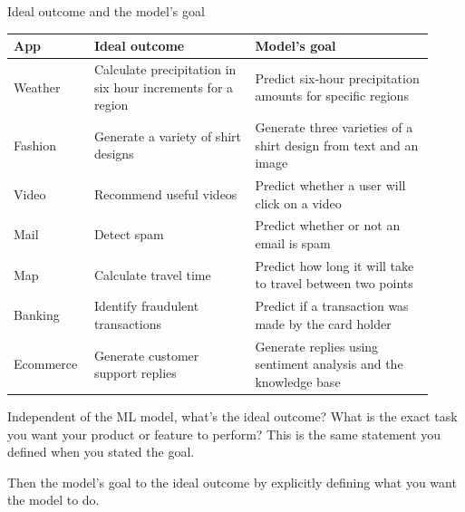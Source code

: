 \begin{frame}{Ideal outcome and the model's goal}
  \begin{withmargin}
    \begin{tdmain}
      \footnotesize
      \begin{tabular}{@{}p{0.16\linewidth}p{0.36\linewidth}p{0.40\linewidth}@{}}
        \toprule
        \textbf{App} & \textbf{Ideal outcome} & \textbf{Model's goal}\\
        \midrule
        Weather & Calculate precipitation in six hour increments for a region
          & Predict six-hour precipitation amounts for specific regions\\[0.3em]
        Fashion & Generate a variety of shirt designs
          & Generate three varieties of a shirt design from text and an image\\[0.3em]
        Video & Recommend useful videos & Predict whether a user will click on a video\\[0.3em]
        Mail & Detect spam & Predict whether or not an email is spam\\[0.3em]
        Map & Calculate travel time & Predict how long it will take to travel between two points\\[0.3em]
        Banking & Identify fraudulent transactions & Predict if a transaction was made by the card holder\\[0.3em]
        Ecommerce & Generate customer support replies & Generate replies using sentiment analysis and the knowledge base\\
        \bottomrule
      \end{tabular}
    \end{tdmain}
    \begin{tdmargin}
      Independent of the ML model, what's the ideal outcome? What is the exact
      task you want your product or feature to perform? This is the same
      statement you defined when you stated the goal.
      \par\medskip
      Then  the model's goal to the ideal outcome by explicitly
      defining what you want the model to do.
    \end{tdmargin}
  \end{withmargin}
\end{frame}

